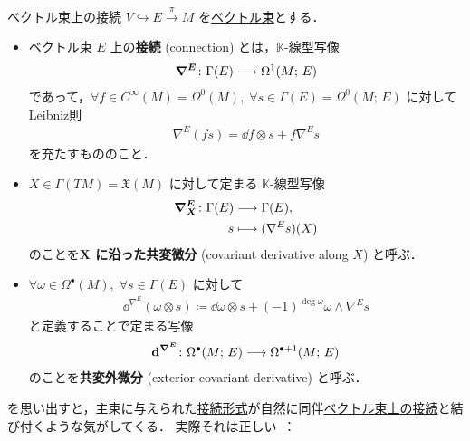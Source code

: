 \documentclass[geometry_main]{subfiles}
\begin{document}
\begin{mydef}[label=def:connection-vect]{ベクトル束上の接続}
    $V \hookrightarrow  E \xrightarrow{\pi} M$ を\hyperref[def:vect]{ベクトル束}とする．
    \begin{itemize}
        \item ベクトル束 $E$ 上の\textbf{接続} (connection) とは，$\mathbb{K}$-線型写像
        \begin{align}
            \bm{\nabla^E} \colon \Gamma(E) \longrightarrow \Omega^1(M;\, E)
        \end{align}
        であって，$\forall f \in C^\infty (M) = \Omega^0 (M),\; \forall s \in \Gamma(E) = \Omega^0 (M;\, E)$ に対してLeibniz則
        \begin{align}
            \nabla^E (fs) = \dd{f} \otimes s + f \nabla^E s
        \end{align}
        を充たすもののこと．
        \item $X \in \Gamma (TM) = \mathfrak{X}(M)$ に対して定まる $\mathbb{K}$-線型写像
        \begin{align}
            \bm{\nabla^E_X} \colon \Gamma(E) &\longrightarrow \Gamma(E), \\
            s &\longmapsto (\nabla^E s)(X)
        \end{align}
        のことを\textbf{$\bm{X}$ に沿った共変微分} (covariant derivative along $X$) と呼ぶ．
        \item $\forall \omega \in \Omega^\bullet(M),\; \forall s \in \Gamma(E)$ に対して
        \begin{align}
            \dd^{\nabla^E}(\omega \otimes s) \coloneqq \dd{\omega} \otimes s + (-1)^{\deg \omega} \omega \wedge \nabla^E s
        \end{align}
        と定義することで定まる写像
        \begin{align}
            \bm{\mathrm{d}^{\nabla^E}} \colon \Omega^\bullet (M;\, E) \longrightarrow \Omega^{\bullet+1} (M;\, E)
        \end{align}
        のことを\textbf{共変外微分} (exterior covariant derivative) と呼ぶ．
    \end{itemize}
\end{mydef}

を思い出すと，主束に与えられた\hyperref[def:connection]{接続形式}が自然に同伴\hyperref[def:connection-vect]{ベクトル束上の接続}と結び付くような気がしてくる．
実際それは正しい~\cite[p.150, 命題6.3.3]{Imano}：
\end{document}
